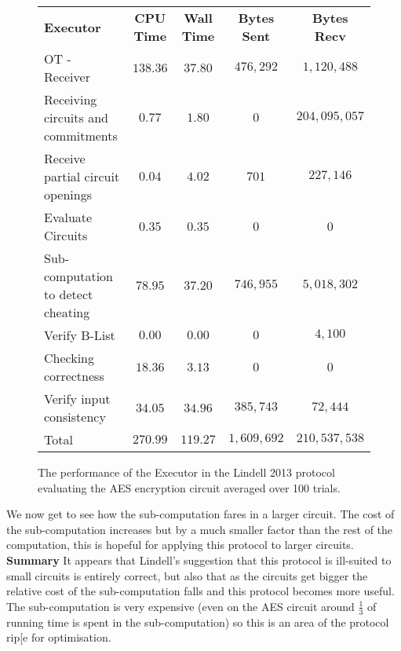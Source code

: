 \documentclass[ %
                    author={Nicholas Tutte},
                supervisor={Prof. Nigel Smart},
                    degree={MEng},
                     title={Secure Two Party Computation},
                  subtitle={A practical comparison of recent protocols},
                      type={Research - GG1K},
                      year={2015} ]{dissertation}
\begin{document}
				\begin{figure}[!ht]
					\begin{tabular}{| p{4.3cm} | c c c c |}
						\hline
						\textbf{Executor} & \textbf{CPU Time} & \textbf{Wall Time} & \textbf{Bytes Sent} & \textbf{Bytes Recv} \\
						\thickhline
						OT - Receiver & $138.36$ & $37.80$ & $476,292$ & $1,120,488$ \\
						\hline
						Receiving circuits and commitments & $0.77$ & $1.80$ & $0$ & $204,095,057$ \\
						\hline
						Receive partial circuit openings & $0.04$ & $4.02$ & $701$ & $227,146$ \\
						\hline
						Evaluate Circuits & $0.35$ & $0.35$ & $0$ & $0$ \\
						\hline
						Sub-computation to detect cheating & $78.95$ & $37.20$ & $746,955$ & $5,018,302$ \\
						\hline
						Verify B-List & $0.00$ & $0.00$ & $0$ & $4,100$ \\
						\hline
						Checking correctness & $18.36$ & $3.13$ & $0$ & $0$ \\
						\hline
						Verify input consistency & $34.05$ & $34.96$ & $385,743$ & $72,444$ \\
						\thickhline
						Total & $270.99$ & $119.27$ & $1,609,692$ & $210,537,538$ \\
						\hline
					\end{tabular}
					\caption{The performance of the Executor in the Lindell 2013 protocol evaluating the AES encryption circuit averaged over 100 trials. \label{table:L_2013_AES_Executor}}
				\end{figure}
				\FloatBarrier

				We now get to see how the sub-computation fares in a larger circuit. The cost of the sub-computation increases but by a much smaller factor than the rest of the computation, this is hopeful for applying this protocol to larger circuits.\\

				\textbf{Summary}
					It appears that Lindell's suggestion that this protocol is ill-suited to small circuits is entirely correct, but also that as the circuits get bigger the relative cost of the sub-computation falls and this protocol becomes more useful.\\

					The sub-computation is very expensive (even on the AES circuit around $\frac{1}{3}$ of running time is spent in the sub-computation) so this is an area of the protocol rip[e for optimisation.\\
\end{document}
